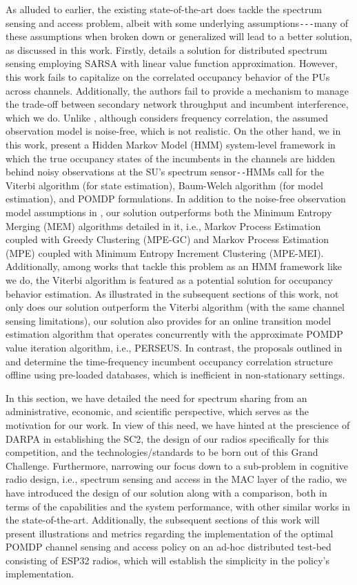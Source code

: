 \documentclass[12pt, draftcls, onecolumn]{IEEEtran}
\begin{document}
As alluded to earlier, the existing state-of-the-art does tackle the spectrum sensing and access problem, albeit with some underlying assumptions\texttt{-{-}-}many of these assumptions when broken down or generalized will lead to a better solution, as discussed in this work. Firstly, \cite{WCL:5} details a solution for distributed spectrum sensing employing SARSA with linear value function approximation. However, this work fails to capitalize on the correlated occupancy behavior of the PUs across channels. Additionally, the authors fail to provide a mechanism to manage the trade-off between secondary network throughput and incumbent interference, which we do. Unlike \cite{WCL:5}, although \cite{WCL:7} considers frequency correlation, the assumed observation model is noise-free, which is not realistic. On the other hand, we in this work, present a Hidden Markov Model (HMM) system-level framework in which the true occupancy states of the incumbents in the channels are hidden behind noisy observations at the SU's spectrum sensor\texttt{-{}-}HMMs call for the Viterbi algorithm (for state estimation), Baum-Welch algorithm (for model estimation), and POMDP formulations. In addition to the noise-free observation model assumptions in \cite{WCL:7}, our solution outperforms both the Minimum Entropy Merging (MEM) algorithms detailed in it, i.e., Markov Process Estimation coupled with Greedy Clustering (MPE-GC) and Markov Process Estimation (MPE) coupled with Minimum Entropy Increment Clustering (MPE-MEI). Additionally, among works that tackle this problem as an HMM framework \cite{WCL:6} like we do, the Viterbi algorithm is featured as a potential solution for occupancy behavior estimation. As illustrated in the subsequent sections of this work, not only does our solution outperform the Viterbi algorithm (with the same channel sensing limitations), our solution also provides for an online transition model estimation algorithm that operates concurrently with the approximate POMDP value iteration algorithm, i.e., PERSEUS. In contrast, the proposals outlined in \cite{WCL:6} and \cite{WCL:7} determine the time-frequency incumbent occupancy correlation structure offline using pre-loaded databases, which is inefficient in non-stationary settings.

In this section, we have detailed the need for spectrum sharing from an administrative, economic, and scientific perspective, which serves as the motivation for our work. In view of this need, we have hinted at the prescience of DARPA in establishing the SC2, the design of our radios specifically for this competition, and the technologies/standards to be born out of this Grand Challenge. Furthermore, narrowing our focus down to a sub-problem in cognitive radio design, i.e., spectrum sensing and access in the MAC layer of the radio, we have introduced the design of our solution along with a comparison, both in terms of the capabilities and the system performance, with other similar works in the state-of-the-art. Additionally, the subsequent sections of this work will present illustrations and metrics regarding the implementation of the optimal POMDP channel sensing and access policy on an ad-hoc distributed test-bed consisting of ESP32 radios, which will establish the simplicity in the policy's implementation.
\end{document}
